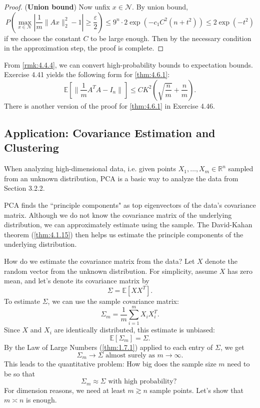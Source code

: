\begin{proof}
(\textbf{Union bound}) Now unfix $x \in \mathcal{N}$. By union bound, 
\[ P \left( \max_{x \in \mathcal{N}} \left| \frac{1}{m}\lVert Ax \rVert_{2}^2 - 1 \right| 
\geq \frac{\varepsilon}{2} \right) 
\leq 9^n \cdot 2 \exp{(-c_1 C^2(n + t^2))} \leq 2 \exp{(-t^2)} \]
if we choose the constant $C$ to be large enough. Then by the necessary condition in the approximation step, 
the proof is complete.
\end{proof}

\begin{remark}
\label{rmk:4.6.2}
From \cref{rmk:4.4.4}, we can convert high-probability bounds to expectation bounds. Exercise 4.41 yields the 
following form for \cref{thm:4.6.1}:
\[ \mathbb{E}\left[ \lVert \frac{1}{m}A^T A - I_n \rVert_{} \right] \leq 
CK^2 \left( \sqrt{\frac{n}{m}} + \frac{n}{m} \right). \]
There is another version of the proof for \cref{thm:4.6.1} in Exercise 4.46.
\end{remark}



\subsection{Application: Covariance Estimation and Clustering}
When analyzing high-dimensional data, i.e. given points $X_1, \dots, X_m \in \mathbb{R}^n$ sampled from an 
unknown distribution, PCA is a basic way to analyze the data from Section 3.2.2.

PCA finds the ``principle components" as top eigenvectors of the data's covariance matrix. Although we do not 
know the covariance matrix of the underlying distribution, we can approximately estimate using the sample. The 
David-Kahan theorem (\cref{thm:4.1.15}) then helps us estimate the principle components of the underlying 
distribution.

How do we estimate the covariance matrix from the data? Let $X$ denote the random vector from the unknown 
distribution. For simplicity, assume $X$ has zero mean, and let's denote its covariance matrix by 
\[ \Sigma = \mathbb{E}\left[ XX^T \right]. \]
To estimate $\Sigma$, we can use the sample covariance matrix:
\[ \Sigma_m = \frac{1}{m}\sum_{i = 1}^{m}X_iX_i^T. \]
Since $X$ and $X_i$ are identically distributed, this estimate is unbiased:
\[ \mathbb{E}\left[ \Sigma_m \right] = \Sigma. \]
By the Law of Large Numbers (\cref{thm:1.7.1}) applied to each entry of $\Sigma$, we get 
\[ \Sigma_m \to \Sigma \text{ almost surely as } m \to \infty. \]
This leads to the quantitative problem: How big does the sample size $m$ need to be so that 
\[ \Sigma_m \approx \Sigma \text{ with high probability? } \]
For dimension reasons, we need at least $m \gtrsim n$ sample points. Let's show that $m \asymp n$ is enough.

